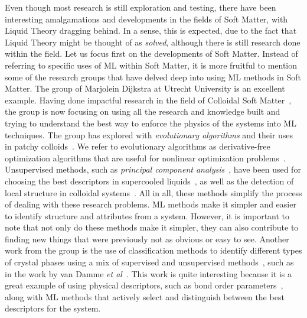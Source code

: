 Even though most research is still exploration and testing, there have been interesting
amalgamations and developments in the fields of Soft Matter, with Liquid Theory dragging
behind. In a sense, this is expected, due to the fact that Liquid Theory might be thought
of as \emph{solved}, although there is still research done within the field.
Let us focus first on the developments of Soft Matter. Instead of referring to specific
uses of ML within Soft Matter, it is more fruitful to mention some of the research groups
that have delved deep into using ML methods in Soft Matter. The group of Marjolein
Dijkstra at Utrecht University is an excellent example. Having done impactful research
in the field of Colloidal Soft Matter~\cite{dijkstraPhaseDiagramHighly1999,leunissenIonicColloidalCrystals2005},
the group is now focusing on using all the research and knowledge built and trying to
understand the best way to enforce the physics of the systems into ML techniques.
The group has explored with \emph{evolutionary algorithms} and their uses in patchy
colloids~\cite{bianchiPredictingPatchyParticle2012}. We refer to evolutionary algorithms as
derivative-free optimization algorithms that are useful for nonlinear optimization
problems~\cite{yuIntroductionEvolutionaryAlgorithms2010}.
Unsupervised methods, such as \emph{principal component analysis}~\cite{hastieElementsStatisticalLearning2009},
have been used for choosing the best descriptors in supercooled liquids~\cite{boattiniAveragingLocalStructure2021},
as well as the detection of local structure in colloidal systems~\cite{boattiniUnsupervisedLearningLocal2019a}.
All in all, these methods simplify the process of dealing with these research problems.
ML methods make it simpler and easier to identify structure and attributes from a
system. However, it is important to note that not only do these methods make it simpler,
they can also contribute to finding new things that were previously not as obvious or easy
to see.
Another work from the group is the use of classification methods 
to identify different types of crystal phases using
a mix of supervised and unsupervised methods~\cite{hastieElementsStatisticalLearning2009},
such as in the work by van Damme \emph{et al}~\cite{vandammeClassifyingCrystalsRounded2020}.
This work is quite interesting because it is a great example of using physical descriptors,
such as bond order parameters~\cite{steinhardtBondorientationalOrderLiquids1983,lechnerAccurateDeterminationCrystal2008},
along with ML methods that actively select and distinguish between the best descriptors
for the system.

